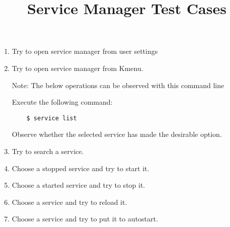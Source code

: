 \documentclass[a4paper,10pt]{article}
\title{Service Manager Test Cases}
\begin{document}
\maketitle
\begin{enumerate}
\item Try to open service manager from user settings

\item Try to open service manager from Kmenu.

Note: The below operations can be observed with this command line 

Execute the following command:
\begin{verbatim}
    $ service list
\end{verbatim}

Observe whether the selected service has made the desirable option.



\item Try to search a service.

\item Choose a stopped service and try to start it.

\item Choose a started service and try to stop  it.

\item Choose a service and try to reload it.

\item Choose a service and try to put it to autostart.

\end{enumerate}
\end{document}

